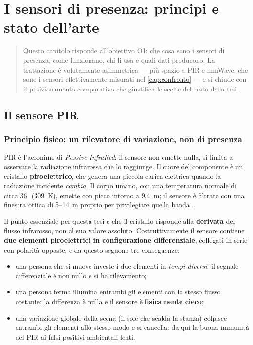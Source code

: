 \chapter{I sensori di presenza: principi e stato dell'arte}
\label{cap:sensori}

\begin{quote}\small
Questo capitolo risponde all'obiettivo O1: che cosa sono i sensori di presenza,
come funzionano, chi li usa e quali dati producono. La trattazione è
volutamente asimmetrica --- più spazio a PIR e mmWave, che sono i sensori
effettivamente misurati nel \cref{cap:confronto} --- e si chiude con il
posizionamento comparativo che giustifica le scelte del resto della tesi.
\end{quote}

\section{Il sensore PIR}
\label{sec:pir}

\subsection{Principio fisico: un rilevatore di variazione, non di presenza}
\label{sec:pir-principio}

PIR è l'acronimo di \emph{Passive InfraRed}: il sensore non emette nulla, si limita
a osservare la radiazione infrarossa che lo raggiunge. Il cuore del componente è un
cristallo \textbf{piroelettrico}, che genera una piccola carica elettrica quando la
radiazione incidente \emph{cambia}. Il corpo umano, con una temperatura normale
di circa 36\,\celsius\ (309~K), emette con picco intorno a 9,4~\textmu m; il sensore è
filtrato con una finestra ottica di 5--14~\textmu m proprio per privilegiare quella
banda~\cite{niceraPyro}.

Il punto essenziale per questa tesi è che il cristallo risponde alla
\textbf{derivata} del flusso infrarosso, non al suo valore assoluto.
Costruttivamente il sensore contiene \textbf{due elementi piroelettrici in
configurazione differenziale}, collegati in serie con polarità opposte, e da questo
seguono tre conseguenze:

\begin{itemize}[leftmargin=1.4em,itemsep=2pt]
  \item una persona che si muove investe i due elementi in \emph{tempi diversi}: il
        segnale differenziale è non nullo e si ha rilevamento;
  \item una persona ferma illumina entrambi gli elementi con lo stesso flusso
        costante: la differenza è nulla e il sensore è \textbf{fisicamente cieco};
  \item una variazione globale della scena (il sole che scalda la stanza) colpisce
        entrambi gli elementi allo stesso modo e si cancella: da qui la buona
        immunità del PIR ai falsi positivi ambientali lenti.
\end{itemize}

